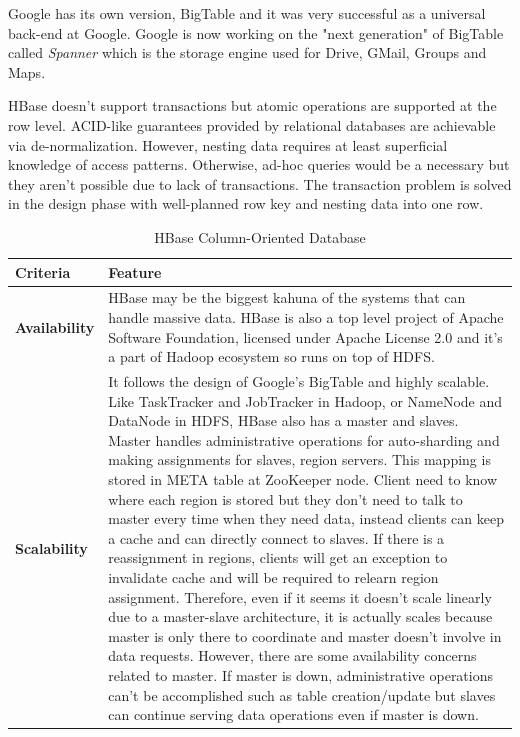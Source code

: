 Google has its own version, BigTable and it was very successful as a universal back-end at Google. Google is now working on the "next generation" of BigTable called \textit{Spanner}\cite{spanner} which is the storage engine used for Drive, GMail, Groups and Maps.

HBase doesn't support transactions but atomic operations are supported at the row level. ACID-like guarantees provided by relational databases are achievable via de-normalization. However, nesting data requires at least superficial knowledge of access patterns. Otherwise, ad-hoc queries would be a necessary but they aren't possible due to lack of transactions. The transaction problem is solved in the design phase with well-planned row key and nesting data into one row.

\begin{table}[H]
  \centering
  \caption{HBase Column-Oriented Database}
  \renewcommand{\arraystretch}{1.5}
  \begin{tabular}{| >{\centering\bfseries}m{1in} | >{\centering\arraybackslash}m{4.5in} |}
	\hline
    \textbf{Criteria} & \textbf{Feature} \\
	\hline
    Availability &
    HBase may be the biggest kahuna of the systems that can handle massive data.
    HBase is also a top level project of Apache Software Foundation, licensed under Apache License 2.0 and it's a part of Hadoop ecosystem so runs on top of HDFS.
    \\ \hline
    Scalability &
    It follows the design of Google's BigTable and highly scalable.
    Like TaskTracker and JobTracker in Hadoop, or NameNode and DataNode in HDFS, HBase also has a master and slaves.
    Master handles administrative operations for auto-sharding and making assignments for slaves, region servers.
    This mapping is stored in META table at ZooKeeper node.
    Client need to know where each region is stored but they don't need to talk to master every time when they need data, instead clients can keep a cache and can directly connect to slaves.
    If there is a reassignment in regions, clients will get an exception to invalidate cache and will be required to relearn region assignment.
    Therefore, even if it seems it doesn't scale linearly due to a master-slave architecture, it is actually scales because master is only there to coordinate and master doesn't involve in data requests.
    However, there are some availability concerns related to master.
    If master is down, administrative operations can't be accomplished such as table creation/update but slaves can continue serving data operations even if master is down.

\end{tabular}
\end{table}
